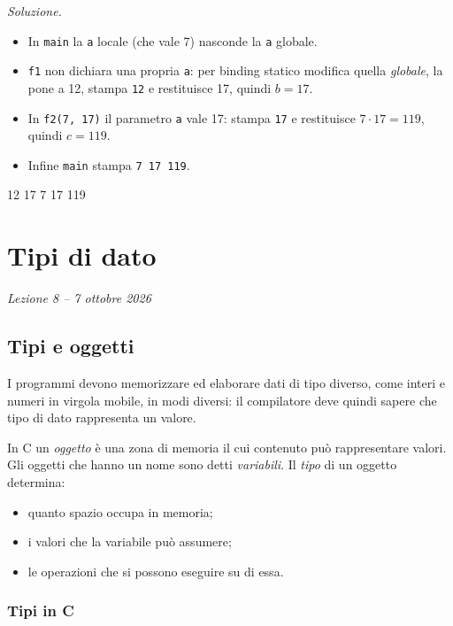 \documentclass[11pt,a4paper]{article}
\begin{document}
\emph{Soluzione.}
\begin{itemize}
    \item In \lstinline|main| la \lstinline|a| locale (che vale 7) nasconde la
          \lstinline|a| globale.
    \item \lstinline|f1| non dichiara una propria \lstinline|a|: per binding
          statico modifica quella \emph{globale}, la pone a 12, stampa
          \texttt{12} e restituisce 17, quindi $b = 17$.
    \item In \lstinline|f2(7, 17)| il parametro \lstinline|a| vale 17: stampa
          \texttt{17} e restituisce $7 \cdot 17 = 119$, quindi $c = 119$.
    \item Infine \lstinline|main| stampa \texttt{7 17 119}.
\end{itemize}
\begin{risultato}
12 17 7 17 119
\end{risultato}

\section[Tipi di dato (Lezione 8 -- 7 ottobre 2026)]{Tipi di dato}
\noindent\emph{Lezione 8 -- 7 ottobre 2026}
\subsection{Tipi e oggetti}

I programmi devono memorizzare ed elaborare dati di tipo diverso, come interi e
numeri in virgola mobile, in modi diversi: il compilatore deve quindi sapere che
tipo di dato rappresenta un valore.

\begin{definizione}
In C un \emph{oggetto} è una zona di memoria il cui contenuto può rappresentare
valori. Gli oggetti che hanno un nome sono detti \emph{variabili}. Il
\emph{tipo} di un oggetto determina:
\begin{itemize}
    \item quanto spazio occupa in memoria;
    \item i valori che la variabile può assumere;
    \item le operazioni che si possono eseguire su di essa.
\end{itemize}
\end{definizione}

\subsubsection{Tipi in C}
\end{document}

